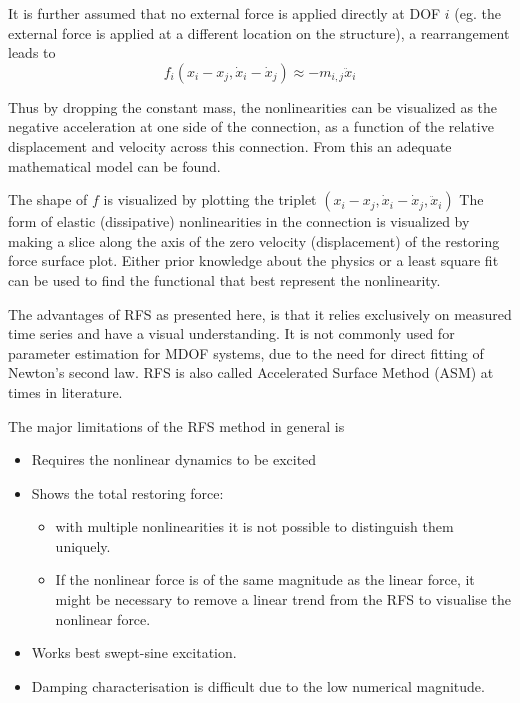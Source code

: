 It is further assumed that no external force is applied directly at DOF $i$
(eg. the external force is applied at a different location on the structure), a
rearrangement leads to
\begin{equation}
  \label{eq:rfs}
  f_i (x_i - x_j , \dot x_i - \dot x_j) \approx -m_{i,j} \ddot x_i
\end{equation}

Thus by dropping the constant mass, the nonlinearities can be visualized as the
negative acceleration at one side of the connection, as a function of the
relative displacement and velocity across this connection. From this an adequate
mathematical model can be found.

The shape of $f$ is visualized by plotting the triplet $(x_{i} - x_{j}, \dot
x_{i} - \dot x_{j}, \ddot x_{i})$ The form of elastic (dissipative)
nonlinearities in the connection is visualized by making a slice along the axis
of the zero velocity (displacement) of the restoring force surface plot. Either
prior knowledge about the physics or a least square fit can be used to find the
functional that best represent the nonlinearity.



The advantages of RFS as presented here, is that it relies exclusively on measured
time series and have a visual understanding. It is not commonly used for
parameter estimation for MDOF systems, due to the need for direct fitting of
Newton's second law.
RFS is also called Accelerated Surface Method (ASM) at times in literature.


The major limitations of the RFS method in general is
\begin{itemize}
\item Requires the nonlinear dynamics to be excited
\item Shows the total restoring force:
  \begin{itemize}
  \item with multiple nonlinearities it is not possible to distinguish them
    uniquely.
  \item If the nonlinear force is of the same magnitude as the linear force, it
    might be necessary to remove a linear trend from the RFS to visualise the
    nonlinear force.
  \end{itemize}
\item Works best swept-sine excitation.
\item Damping characterisation is difficult due to the low numerical magnitude.
\end{itemize}


